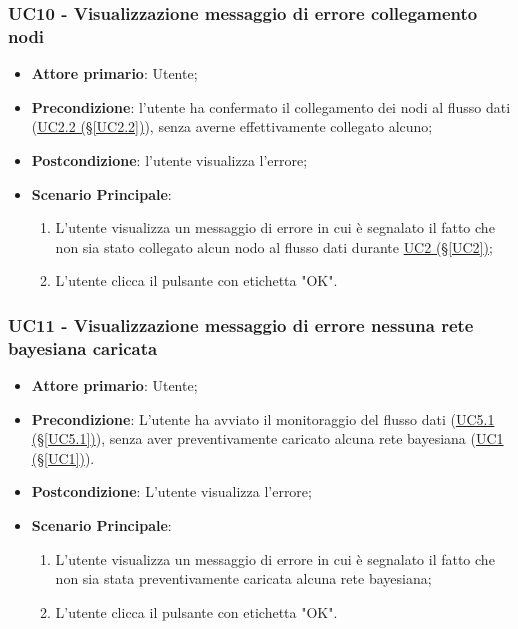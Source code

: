\pagebreak

\subsubsection{UC10 - Visualizzazione messaggio di errore collegamento nodi}\label{UC10}
\begin{itemize}
\item \textbf{Attore primario}: Utente;
\item \textbf{Precondizione}: l'utente ha confermato il collegamento dei nodi al flusso dati (\hyperref[UC2.2]{UC2.2 (§\ref*{UC2.2})}), senza averne effettivamente collegato alcuno;
\item \textbf{Postcondizione}: l'utente visualizza l'errore;
\item \textbf{Scenario Principale}: 
	\begin{enumerate}
	\item L'utente visualizza un messaggio di errore in cui è segnalato il fatto che non sia stato collegato alcun 				nodo al flusso dati durante \hyperref[UC2]{UC2 (§\ref*{UC2})};
	\item L'utente clicca il pulsante con etichetta "OK".
	\end{enumerate}
\end{itemize}

\pagebreak

\subsubsection{UC11 - Visualizzazione messaggio di errore nessuna rete bayesiana caricata}\label{UC11}
\begin{itemize}
\item \textbf{Attore primario}: Utente;
\item \textbf{Precondizione}: L'utente ha avviato il monitoraggio del flusso dati (\hyperref[UC5.1]{UC5.1 (§\ref*{UC5.1})}), senza aver preventivamente caricato alcuna rete bayesiana (\hyperref[UC1]{UC1 (§\ref*{UC1})}).
\item \textbf{Postcondizione}: L'utente visualizza l'errore;
\item \textbf{Scenario Principale}: 
	\begin{enumerate}
	\item L'utente visualizza un messaggio di errore in cui è segnalato il fatto che non sia stata preventivamente 				caricata alcuna rete bayesiana;
	\item L'utente clicca il pulsante con etichetta "OK".
	\end{enumerate}
\end{itemize}

